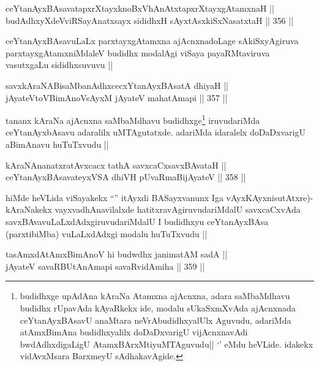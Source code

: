 \begin{shl}
ceYtanAyxBAsavatapxrXtayxknoBxVhAnAtxtapxrXtayxgAtamxnaH || \\
budAdhxyXdeVviRSayAnatxsayx sididhxH sAyxtAsxkiSxNasatxtaH ||  356 ||  
\end{shl}

\begin{artha}
ceYtanAyxBAsavuLaLx parxtayxgAtamxna ajAcnxnadoLage sAkiSxyAgiruva parxtayxgAtamxniMdaleV budidhx modalAgi viSaya payaRMtaviruva vasutxgaLu sididhxsuvuvu ||
\end{artha}


\begin{shl}
savxkAraNABisaMbanAdhxcecxYtanAyxBAsatA dhiyaH || \\
jAyateV\s toV\s BimAnoV\s sAyxM jAyateV mahatAmapi ||  357 ||  
\end{shl}

\begin{artha}
tananx kAraNa ajAcnxna saMbaMdhavu budidhxge\footnote{budidhxge upAdAna kAraNa Atamxna ajAcnxna, adara saMbaMdhavu budidhx rUpavAda kAyaRkekx ide, modalu sUkaSxmXvAda ajAcnxnada ceYtanAyxBAsavU anaMtara neVrAbudidhxyalUlx Aguvudu, adariMda atAmxBimAna budidhxyalilx doDaDxvarigU vijAcnxnavAdi bwdAdhxdigaLigU AtamxBArxMtiyuMTAguvudu|| `\stext' eMdu heVLide. idakekx vidAvxMsara BarxmeyU sAdhakavAgide.} iruvudariMda ceYtanAyxbAsavu adaralilx uMTAgutatxde. adariMda idaralelx doDaDxvarigU aBimAnavu huTuTxvudu ||
\end{artha}

\begin{shl}
kAraNAnanatxratAvxcacx tathA savxcaCxsavxBAvataH || \\
ceYtanAyxBAsavateyxVSA dhiVH pUvaRmaBijAyateV ||  358 ||  
\end{shl}

\begin{artha}
hiMde heVLida viSayakekx ``\stext'' itAyxdi BASayxvanunx Iga vAyxKAyxnisutAtxre)- kAraNakekx vayxvadhAnavilalxde hatitxravAgiruvudariMdalU savxcaCxvAda savxBAvavuLaLxdAdxgiruvudariMdalU I budidhxyu ceYtanAyxBAsa (parxtibiMba) vuLaLxdAdxgi modalu huTuTxvudu ||
\end{artha}

\begin{shl}
tasAmxdAtAmxBimAnoV hi budwdhx janimatAM sadA || \\
jAyateV savaRBUtAnAmapi savaRvidAmiha ||  359 ||  
\end{shl}

